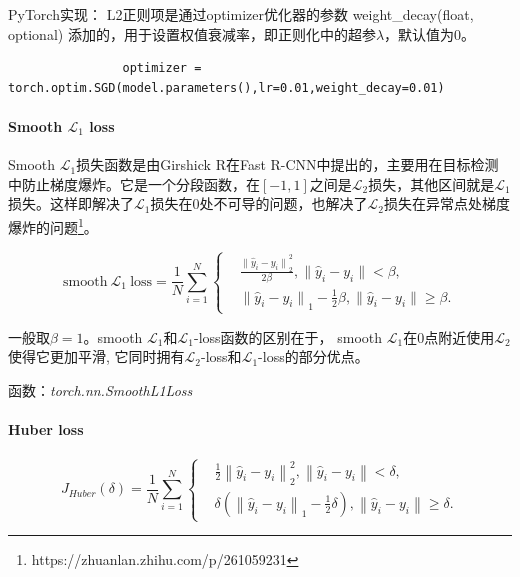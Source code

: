 \documentclass[letterpaper,12pt]{article}
\begin{document}
			PyTorch实现： L2正则项是通过optimizer优化器的参数 weight\_decay(float, optional) 添加的，用于设置权值衰减率，即正则化中的超参$\lambda$，默认值为0。
			
			\lstset{language=python,breaklines=true}
			\begin{lstlisting}
				optimizer = torch.optim.SGD(model.parameters(),lr=0.01,weight_decay=0.01)
			\end{lstlisting}

			\paragraph{Smooth $\mathcal{L}_1$ loss}
	
			Smooth $\mathcal{L}_1$损失函数是由Girshick R在Fast R-CNN中提出的，主要用在目标检测中防止梯度爆炸。它是一个分段函数，在$\left[-1,1\right]$之间是$\mathcal{L}_2$损失，其他区间就是$\mathcal{L}_1$损失。这样即解决了$\mathcal{L}_1$损失在0处不可导的问题，也解决了$\mathcal{L}_2$损失在异常点处梯度爆炸的问题\footnote{https://zhuanlan.zhihu.com/p/261059231}。
			
			\begin{equation}
				\text{smooth} \ \mathcal{L}_1 \ \text{loss} = \frac{1}{N}\sum_{i=1}^{N}
				\left\{
				\begin{aligned}
					&\frac{{\|\hat{y}_i - y_i \|}_2^{2}}{2\beta}, \| \hat{y}_i -y_i \| < \beta , \\
					&{\|\hat{y}_i - y_i \|}_1 - \frac{1}{2}\beta, \| \hat{y}_i -y_i \| \geq \beta.
				\end{aligned}
				\right.
			\end{equation}		
	
			一般取$\beta=1$。smooth $\mathcal{L}_1$和$\mathcal{L}_1$-loss函数的区别在于， smooth $\mathcal{L}_1$在0点附近使用$\mathcal{L}_2$使得它更加平滑, 它同时拥有$\mathcal{L}_2$-loss和$\mathcal{L}_1$-loss的部分优点。
	
			函数：\textit{torch.nn.SmoothL1Loss}
			
			\paragraph{Huber loss}
			
			\begin{equation}
			J_{Huber}(\delta)= \frac{1}{N}\sum_{i=1}^{N}
				\left\{
				\begin{aligned}
					&\frac{1}{2}{\left\|\hat{y}_i - y_i \right\|}_2^{2}, \left\| \hat{y}_i -y_i \right\| < \delta , \\
					&\delta\left({\left\|\hat{y}_i - y_i \right\|}_1 - \frac{1}{2}\delta \right), \left\| \hat{y}_i -y_i \right\| \geq \delta.
				\end{aligned}
				\right.
			\end{equation}
	
\end{document}
